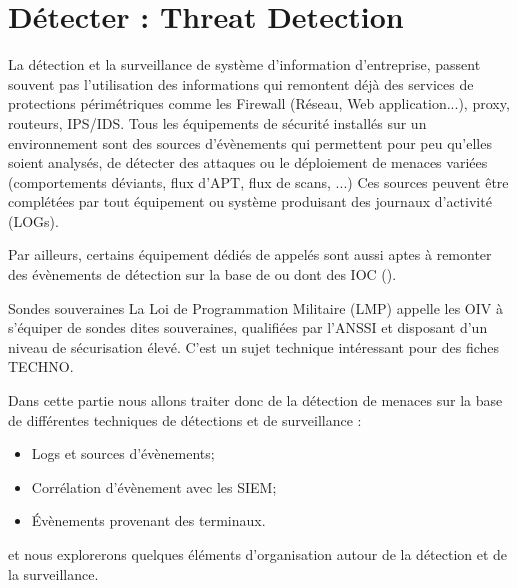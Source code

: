 

\section{Détecter : Threat Detection}

La détection et la surveillance de système d'information d'entreprise, passent souvent pas l'utilisation des informations qui remontent déjà des services de protections périmétriques comme les Firewall (Réseau, Web application...),  proxy,  routeurs, IPS/IDS. Tous les équipements de sécurité installés sur un environnement sont des sources d'évènements qui permettent pour peu qu'elles soient analysés, de détecter des attaques ou le déploiement de menaces variées (comportements déviants, flux d'APT, flux de scans, ...)
Ces sources peuvent être complétées par tout équipement ou système  produisant des journaux d'activité (LOGs).

Par ailleurs, certains équipement dédiés de  appelés  sont aussi aptes à remonter des évènements de détection sur la base de  ou  dont des IOC ().

\begin{warningbox}{Sondes souveraines}
La Loi de Programmation Militaire (LMP) appelle les OIV à s’équiper de sondes dites souveraines, qualifiées par l’ANSSI et  disposant d’un niveau de sécurisation élevé. C'est un sujet technique intéressant pour des fiches TECHNO. 
\end{warningbox}

Dans cette partie nous allons traiter donc de la détection de menaces sur la base  de différentes techniques de détections et de surveillance :

\begin{itemize}
  \item Logs et sources d'évènements; 
  \item Corrélation d'évènement avec les SIEM;
  \item Évènements provenant des terminaux.
\end{itemize}

et nous explorerons quelques éléments d'organisation autour de la détection et de la surveillance.

